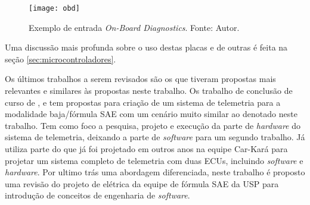 \begin{figure}[!htb]
	\centering
		\texttt{[image: obd]}
		\caption{Exemplo de entrada \textit{On-Board Diagnostics}. Fonte: Autor.}
		\label{fig:obd}
\end{figure}
     
Uma discussão mais profunda sobre o uso destas placas e de outras é feita na seção \ref{sec:microcontroladores}. 

Os últimos trabalhos a serem revisados são os que tiveram propostas mais relevantes e similares às propostas neste trabalho. Os trabalho de conclusão de curso de \cite{Dias2010}, \cite{Nunes2016} e \cite{Pereira2012} tem propostas para criação de um sistema de telemetria para a modalidade baja/fórmula SAE com um cenário muito similar ao denotado neste trabalho. \cite{Dias2010} Tem como foco a pesquisa, projeto e execução da parte de \textit{hardware} do sistema de telemetria, deixando a parte de \textit{software} para um segundo trabalho. Já \cite{Nunes2016} utiliza parte do que já foi projetado em outros anos na equipe Car-Kará para projetar um sistema completo de telemetria com duas ECUs, incluindo \textit{software} e \textit{hardware}. Por ultimo \cite{Pereira2012} trás uma abordagem diferenciada, neste trabalho é proposto uma revisão do projeto de elétrica da equipe de fórmula SAE da USP para introdução de conceitos de engenharia de \textit{software}.

